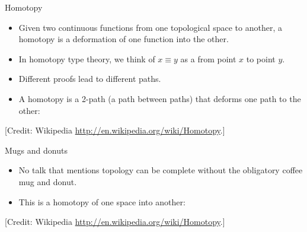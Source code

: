 \documentclass[11pt]{beamer}
\newcommand{\red}[1]{{\color{red}{#1}}}
\begin{document}
\begin{frame}{Homotopy}
\vfill
\begin{itemize}

\vfill\item Given two continuous functions from one topological space to
another, a homotopy is a deformation of one function into the other.

\vfill\item In homotopy type theory, we think of $x \equiv y$ as a \red{path}
from point $x$ to point $y$.

\vfill\item Different proofs lead to different paths. 

\vfill\item A homotopy is a 2-path (a path between paths) that deforms one
path to the other:
\begin{center}
\end{center}

\end{itemize}

\vfill\footnotesize{[Credit: Wikipedia
    \url{http://en.wikipedia.org/wiki/Homotopy}.]}
\end{frame}

\begin{frame}{Mugs and donuts}

\begin{itemize}
\vfill\item No talk that mentions topology can be complete without the
obligatory coffee mug and donut.

\vfill\item This is a homotopy of one space into another:
\begin{center}
\end{center}

\end{itemize}

\vfill\footnotesize{[Credit: Wikipedia
    \url{http://en.wikipedia.org/wiki/Homotopy}.]}
\end{frame}
\end{document}
